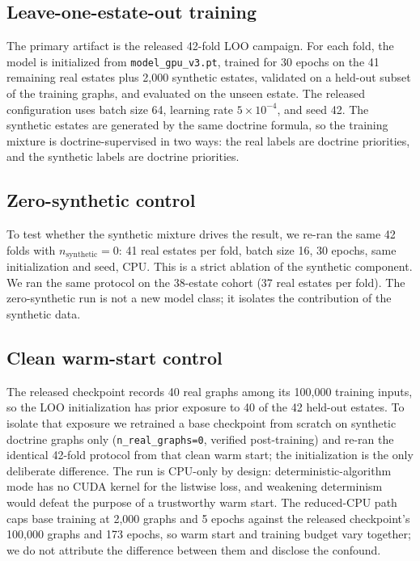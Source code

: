 \documentclass[conference,10pt]{IEEEtran}
\begin{document}
\subsection{Leave-one-estate-out training}
The primary artifact is the released 42-fold LOO campaign. For each fold, the model is
initialized from \texttt{model\_gpu\_v3.pt}, trained for 30 epochs on the 41 remaining real
estates plus 2,000 synthetic estates, validated on a held-out subset of the training graphs, and
evaluated on the unseen estate. The released configuration uses batch size 64, learning rate
$5\times10^{-4}$, and seed 42. The synthetic estates are generated by the same doctrine formula,
so the training mixture is doctrine-supervised in two ways: the real labels are doctrine
priorities, and the synthetic labels are doctrine priorities.

\subsection{Zero-synthetic control}
To test whether the synthetic mixture drives the result, we re-ran the same 42 folds with
$n_{\text{synthetic}}=0$: 41 real estates per fold, batch size 16, 30 epochs, same
initialization and seed, CPU. This is a strict ablation of the synthetic component. We ran the
same protocol on the 38-estate cohort (37 real estates per fold). The zero-synthetic run is not
a new model class; it isolates the contribution of the synthetic data.

\subsection{Clean warm-start control}
The released checkpoint records 40 real graphs among its 100{,}000 training inputs, so the LOO
initialization has prior exposure to 40 of the 42 held-out estates. To isolate that exposure we
retrained a base checkpoint from scratch on synthetic doctrine graphs only
(\texttt{n\_real\_graphs=0}, verified post-training) and re-ran the identical 42-fold protocol
from that clean warm start; the initialization is the only deliberate difference. The run is
CPU-only by design: deterministic-algorithm mode has no CUDA kernel for the listwise loss, and
weakening determinism would defeat the purpose of a trustworthy warm start. The reduced-CPU
path caps base training at 2{,}000 graphs and 5 epochs against the released checkpoint's
100{,}000 graphs and 173 epochs, so warm start and training budget vary together; we do not
attribute the difference between them and disclose the confound.
\end{document}
